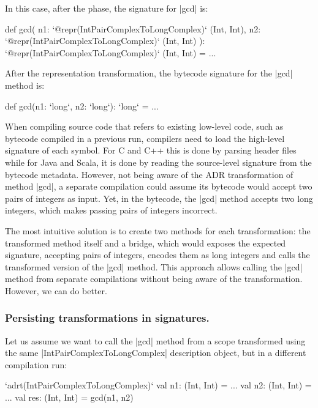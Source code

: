 In this case, after the \inject{} phase, the signature for |gcd| is:

\begin{lstlisting-nobreak}
def gcd(
    n1: `@repr(IntPairComplexToLongComplex)` (Int, Int),
    n2: `@repr(IntPairComplexToLongComplex)` (Int, Int)
  ): `@repr(IntPairComplexToLongComplex)` (Int, Int) = ...
\end{lstlisting-nobreak}

After the representation transformation, the bytecode signature for the |gcd| method is:

\begin{lstlisting-nobreak}
def gcd(n1: `long`, n2: `long`): `long` = ...
\end{lstlisting-nobreak}

When compiling source code that refers to existing low-level code, such as bytecode compiled in a previous run, compilers need to load the high-level signature of each symbol. For C and C++ this is done by parsing header files while for Java and Scala, it is done by reading the source-level signature from the bytecode metadata. However, not being aware of the ADR transformation of method |gcd|, a separate compilation could assume its bytecode would accept two pairs of integers as input. Yet, in the bytecode, the |gcd| method accepts two long integers, which makes passing pairs of integers incorrect.

The most intuitive solution is to create two methods for each transformation: the transformed method itself and a bridge, which would exposes the expected signature, accepting pairs of integers, encodes them as long integers and calls the transformed version of the |gcd| method. This approach allows calling the |gcd| method from separate compilations without being aware of the transformation. However, we can do better.

\subsubsection{Persisting transformations in signatures.} Let us assume we want to call the |gcd| method from a scope transformed using the same |IntPairComplexToLongComplex| description object, but in a different compilation run:

\begin{lstlisting-nobreak}
`adrt(IntPairComplexToLongComplex)` {
  val n1: (Int, Int) = ...
  val n2: (Int, Int) = ...
  val res: (Int, Int) = gcd(n1, n2)
}
\end{lstlisting-nobreak}

